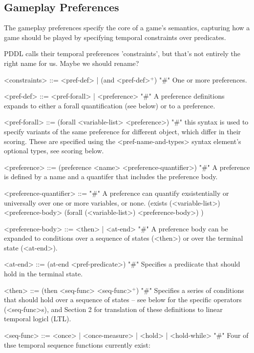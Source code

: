 \documentclass{article}
\begin{document}
\subsection{Gameplay Preferences}
The gameplay preferences specify the core of a game's semantics, capturing how a game should be played by specifying temporal constraints over predicates. 
        
        PDDL calls their temporal preferences 'constraints', but that's not entirely the right name for us. Maybe we should rename? \\
        
\begin{grammar}
<constraints> ::= <pref-def> | (and <pref-def>$^+$)  "#" One or more preferences.
    
<pref-def> ::= <pref-forall> | <preference> "#" A preference definitions expands to either a forall quantification (see below) or to a preference.

<pref-forall> ::= (forall <variable-list> <preference>) "#" this syntax is used to specify variants of the same preference for different object, which differ in their scoring. These are specified using the <pref-name-and-types> syntax element's optional types, see scoring below.
    
<preference> ::= (preference <name> <preference-quantifier>) "#" A preference is defined by a name and a quantifer that includes the preference body.

<preference-quantifier> ::= "#" A preference can quantify exsistentially or universally over one or more variables, or none. 
\alt (exists (<variable-list>) <preference-body> 
\alt  (forall (<variable-list>) <preference-body>)
) 

<preference-body> ::=  <then> | <at-end>  "#" A preference body can be expanded to conditions over a sequence of states (<then>) or over the terminal state (<at-end>).  

<at-end> ::= (at-end <pref-predicate>) "#" Specifies a prediicate that should hold in the terminal state.

<then> ::= (then <seq-func> <seq-func>$^+$) "#" Specifies a series of conditions that should hold over a sequence of states -- see below for the specific operators (<seq-func>s), and Section 2 for translation of these definitions to linear temporal logicl (LTL).

<seq-func> ::= <once> | <once-measure> | <hold> | <hold-while> "#" Four of thse temporal sequence functions currently exist: 


\end{grammar}
\end{document}
